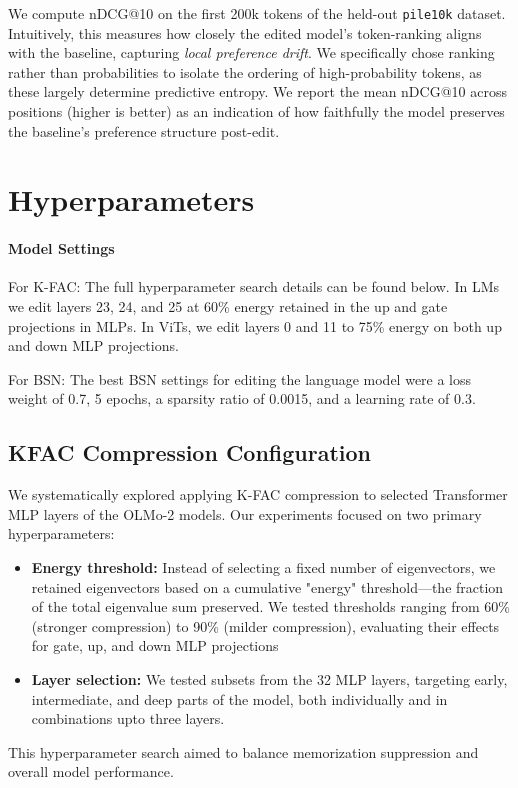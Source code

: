 \documentclass{article} %
\begin{document}
We compute nDCG@10 on the first 200k tokens of the held-out \texttt{pile10k} dataset. Intuitively, this measures how closely the edited model's token-ranking aligns with the baseline, capturing \emph{local preference drift}. We specifically chose ranking rather than probabilities to isolate the ordering of high-probability tokens, as these largely determine predictive entropy. We report the mean nDCG@10 across positions (higher is better) as an indication of how faithfully the model preserves the baseline's preference structure post-edit.

\section{Hyperparameters}
\label{sec:hparams}
\paragraph{Model Settings}

For K-FAC: The full hyperparameter search details can be found below. In LMs we edit layers 23, 24, and 25 at 60\% energy retained in the up and gate projections in MLPs. In ViTs, we edit layers 0 and 11 to 75\% energy on both up and down MLP projections.

For BSN: The best BSN settings for editing the language model were a loss weight of 0.7, 5 epochs, a sparsity ratio of 0.0015, and a learning rate of 0.3.
\subsection{KFAC Compression Configuration} 
We systematically explored applying K-FAC compression to selected Transformer MLP layers of the OLMo-2 models. Our experiments focused on two primary hyperparameters:
\begin{itemize}
    \item \textbf{Energy threshold:} Instead of selecting a fixed number of eigenvectors, we retained eigenvectors based on a cumulative "energy" threshold—the fraction of the total eigenvalue sum preserved. We tested thresholds ranging from 60\% (stronger compression) to 90\% (milder compression), evaluating their effects for gate, up, and down MLP projections
        \item \textbf{Layer selection:} We tested subsets from the 32 MLP layers, targeting early, intermediate, and deep parts of the model, both individually and in combinations upto three layers.
\end{itemize}
This hyperparameter search aimed to balance memorization suppression and overall model performance.
\end{document}
